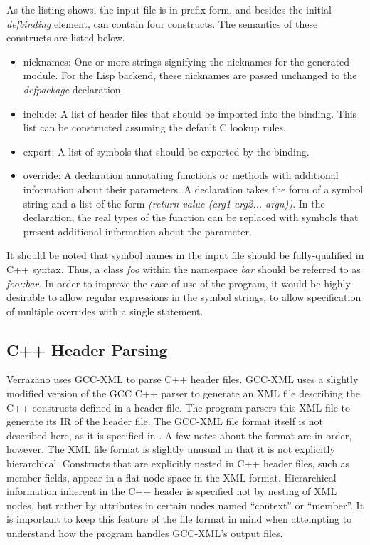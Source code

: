 \documentclass[12pt]{article}
\begin{document}
As the listing shows, the input file is in prefix form, and besides the initial \emph{defbinding} element, can contain four constructs. The semantics of these constructs are listed below.

\begin{itemize}
\item nicknames: One or more strings signifying the nicknames for the generated module. For the Lisp backend, these nicknames are passed unchanged to the \emph{defpackage} declaration.
\item include: A list of header files that should be imported into the binding. This list can be constructed assuming the default C lookup rules.
\item export: A list of symbols that should be exported by the binding. 
\item override: A declaration annotating functions or methods with additional information about their parameters. A declaration takes the form of a symbol string and a list of the form \emph{(return-value (arg1 arg2... argn))}. In the declaration, the real types of the function can be replaced with symbols that present additional information about the parameter. 
\end{itemize}

It should be noted that symbol names in the input file should be fully-qualified in C++ syntax. Thus, a class \emph{foo} within the namespace \emph{bar} should be referred to as \emph{foo::bar}. In order to improve the ease-of-use of the program, it would be highly desirable to allow regular expressions in the symbol strings, to allow specification of multiple overrides with a single statement.

\subsection{C++ Header Parsing}
Verrazano uses GCC-XML to parse C++ header files. GCC-XML uses a slightly modified version of the GCC C++ parser to generate an XML file describing the C++ constructs defined in a header file. The program parsers this XML file to generate its IR of the header file. The GCC-XML file format itself is not described here, as it is specified in \cite{DTD}. A few notes about the format are in order, however. The XML file format is slightly unusual in that it is not explicitly hierarchical. Constructs that are explicitly nested in C++ header files, such as member fields, appear in a flat node-space in the XML format. Hierarchical information inherent in the C++ header is specified not by nesting of XML nodes, but rather by attributes in certain nodes named ``context'' or ``member''. It is important to keep this feature of the file format in mind when attempting to understand how the program handles GCC-XML's output files.
\end{document}
